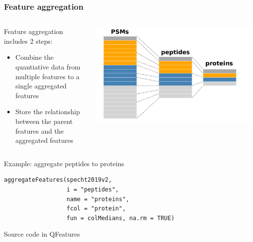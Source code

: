 \documentclass{beamer}
\newcommand{\hcode}[2][lgray]{{\ttfamily\color{vdgray}\colorbox{#1}{#2}}}
\newcommand{\frametitlesection}[1]{\frametitle{\centering #1 \footnotesize \hspace{0pt plus 1 filll} \insertsection}}
\begin{document}
\begin{frame}[fragile]
    \frametitlesection{Feature aggregation}

    \begin{columns}
        \begin{column}{0.6\textwidth}
            Feature aggregation includes 2 steps:
            \begin{itemize}
                \item{Combine the quantiative data from multiple features to a
                single aggregated features}
                \item{Store the relationship between the parent features and the
                aggregated features}
            \end{itemize}
        \end{column}
        \begin{column}{0.4\textwidth}
            \includegraphics[width=\textwidth]{figs/QFeatures.pdf}
        \end{column}
    \end{columns}

    \bigskip

    Example: aggregate peptides to proteins

    \begin{lstlisting}
aggregateFeatures(specht2019v2,
                  i = "peptides",
                  name = "proteins",
                  fcol = "protein",
                  fun = colMedians, na.rm = TRUE)
    \end{lstlisting}

    Source code in \hcode{QFeatures}

\end{frame}
\end{document}
